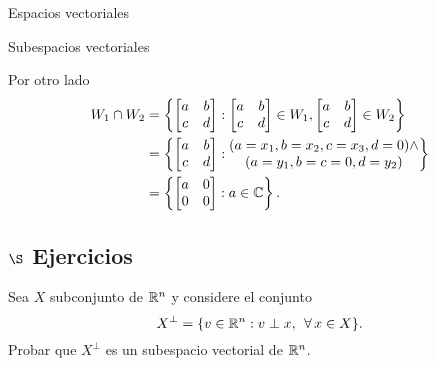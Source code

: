 \begin{chapter}{Espacios vectoriales}
\begin{section}{Subespacios vectoriales}
\begin{ejemplo*}
\begin{enumerate}
            Por otro lado
            \begin{align*}
                W_1 \cap W_2 &= \left\{\begin{bmatrix} a&b\\c&d\end{bmatrix}:  \begin{bmatrix} a&b\\c&d\end{bmatrix} \in W_1, \begin{bmatrix} a&b\\c&d\end{bmatrix} \in W_2\right\} \\
                &= \left\{\begin{bmatrix} a&b\\c&d\end{bmatrix}:  \begin{matrix}
                (a =x_1, b = x_2, c = x_3,d =0)\wedge \\(a = y_1, b=c=0, d= y_2)
                \end{matrix} \right\} \\
                &= \left\{\begin{bmatrix} a&0\\0&0\end{bmatrix}:  a \in \mathbb C\right\} .
            \end{align*}
        \end{enumerate}
    \end{ejemplo*}

    \subsection*{$\S$ Ejercicios}
    \begin{enumex}
        \item Sea $X$ subconjunto de $\mathbb R^n$ y  considere el conjunto 
            $$
            X^\perp = \{v \in \mathbb R^n: v \perp x,\; \, \forall\, x \in X\}. 
            $$
            Probar que $X^\perp$  es un subespacio vectorial de $\mathbb R^n$. 
    \end{enumex}

\end{section}	
        

\end{chapter}

